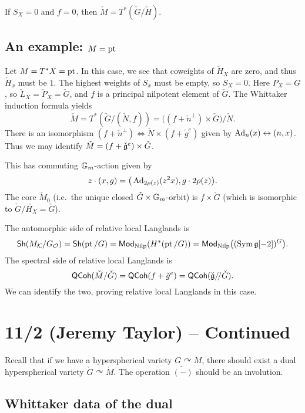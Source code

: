 \documentclass{article}
\begin{document}
\begin{ex}
	If $S_X = 0$ and $f = 0$, then $\check{M} = T^*(\check{G} / \check{H})$.
\end{ex}

\subsection{An example: $M = \operatorname{pt}$}

\begin{ex}
	Let $M = T^*X = \operatorname{pt}$.
	In this case, we see that coweights of $\check{H}_X$ are zero, and thus $\check{H}_x$ must be $1$.
	The highest weights of $S_x$ must be empty, so $S_X = 0$.
	Here $P_X = G$, so $\check{L}_X = \check{P}_X = \check{G}$, and $f$ is a principal nilpotent element of $\check{G}$.
	The Whittaker induction formula yields 
	\[
		\check{M} = T^*(\check{G} / (\check{N}, f)) = \big((f + \check{n}^\perp) \times \check{G}\big) / \check{N}.
	\]
	There is an isomorphism $(f + \check{n}^\perp) \Leftrightarrow \check{N} \times (f + \check{g}^e)$ given by $\operatorname{Ad}_n(x) \leftrightarrow (n, x)$.
	Thus we may identify $\check{M} = (f + \check{\mathfrak{g}}^e) \times \check{G}$.

	This has commuting $\mathbb{G}_m$-action given by
	\[
		z \cdot (x, g) = \big(\operatorname{Ad}_{2\rho(z)}(z^2 x), g \cdot 2\rho(z)\big).
	\]
	The core $\check{M}_0$ (i.e.\ the unique closed $\check{G} \times \mathbb{G}_m$-orbit) is $f \times \check{G}$ (which is isomorphic to $\check{G} / \check{H_X} = \check{G}$).

	The automorphic side of relative local Langlands is 
	\[
		\mathsf{Sh}(M_{\mathcal{K}} / G_{\mathcal{O}}) = \mathsf{Sh}(\operatorname{pt} / G) = \mathsf{Mod}_{\mathrm{Nilp}}(H^*(\operatorname{pt} / G)) = \mathsf{Mod}_{\mathrm{Nilp}}\big((\operatorname{Sym} \mathfrak{g}[-2])^G\big).
	\]
	The spectral side of relative local Langlands is
	\[
		\mathsf{QCoh}(\check{M} / \check{G}) = \mathsf{QCoh}(f + \check{g}^e) = \mathsf{QCoh}(\check{\mathfrak{g}} /\mkern-3mu/ \check{G}).
	\]
	We can identify the two, proving relative local Langlands in this case.
\end{ex}

\section{11/2 (Jeremy Taylor) -- Continued}

Recall that if we have a hyperspherical variety $G \curvearrowright M$, there should exist a dual hyperspherical variety $\check{G} \curvearrowright \check{M}$.
The operation $\check{(-)}$ should be an involution.

\subsection{Whittaker data of the dual}
\end{document}
